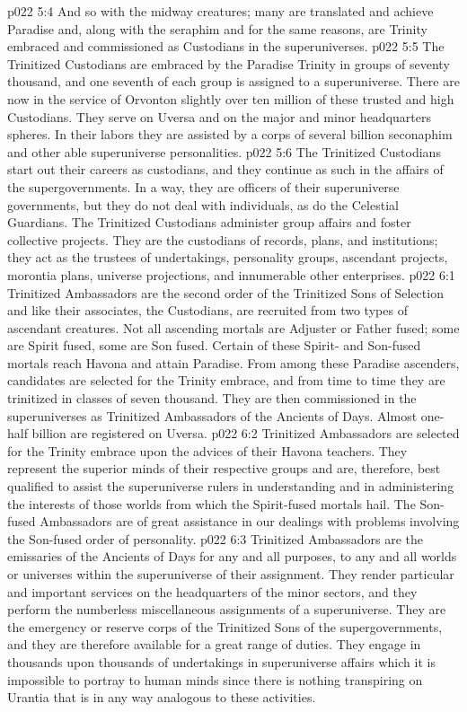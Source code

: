 \vs p022 5:4 And so with the midway creatures; many are translated and achieve Paradise and, along with the seraphim and for the same reasons, are Trinity embraced and commissioned as Custodians in the superuniverses.
\vs p022 5:5 The Trinitized Custodians are embraced by the Paradise Trinity in groups of seventy thousand, and one seventh of each group is assigned to a superuniverse. There are now in the service of Orvonton slightly over ten million of these trusted and high Custodians. They serve on Uversa and on the major and minor headquarters spheres. In their labors they are assisted by a corps of several billion seconaphim and other able superuniverse personalities.
\vs p022 5:6 The Trinitized Custodians start out their careers as custodians, and they continue as such in the affairs of the supergovernments. In a way, they are officers of their superuniverse governments, but they do not deal with individuals, as do the Celestial Guardians. The Trinitized Custodians administer group affairs and foster collective projects. They are the custodians of records, plans, and institutions; they act as the trustees of undertakings, personality groups, ascendant projects, morontia plans, universe projections, and innumerable other enterprises.
\vs p022 6:1 Trinitized Ambassadors are the second order of the Trinitized Sons of Selection and like their associates, the Custodians, are recruited from two types of ascendant creatures. Not all ascending mortals are Adjuster or Father fused; some are Spirit fused, some are Son fused. Certain of these Spirit\hyp{} and Son\hyp{}fused mortals reach Havona and attain Paradise. From among these Paradise ascenders, candidates are selected for the Trinity embrace, and from time to time they are trinitized in classes of seven thousand. They are then commissioned in the superuniverses as Trinitized Ambassadors of the Ancients of Days. Almost one\hyp{}half billion are registered on Uversa.
\vs p022 6:2 Trinitized Ambassadors are selected for the Trinity embrace upon the advices of their Havona teachers. They represent the superior minds of their respective groups and are, therefore, best qualified to assist the superuniverse rulers in understanding and in administering the interests of those worlds from which the Spirit\hyp{}fused mortals hail. The Son\hyp{}fused Ambassadors are of great assistance in our dealings with problems involving the Son\hyp{}fused order of personality.
\vs p022 6:3 Trinitized Ambassadors are the emissaries of the Ancients of Days for any and all purposes, to any and all worlds or universes within the superuniverse of their assignment. They render particular and important services on the headquarters of the minor sectors, and they perform the numberless miscellaneous assignments of a superuniverse. They are the emergency or reserve corps of the Trinitized Sons of the supergovernments, and they are therefore available for a great range of duties. They engage in thousands upon thousands of undertakings in superuniverse affairs which it is impossible to portray to human minds since there is nothing transpiring on Urantia that is in any way analogous to these activities.
